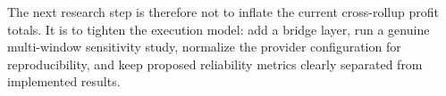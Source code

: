 \documentclass[11pt]{article}
\begin{document}
The next research step is therefore not to inflate the current cross-rollup profit totals. It is to tighten the execution model: add a bridge layer, run a genuine multi-window sensitivity study, normalize the provider configuration for reproducibility, and keep proposed reliability metrics clearly separated from implemented results.



\end{document}
